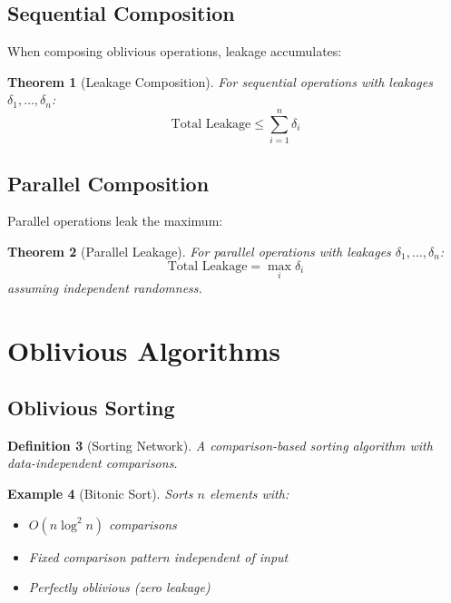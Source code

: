 \documentclass[11pt,final,hidelinks]{article}
\newtheorem{theorem}{Theorem}[section]
\newtheorem{definition}[theorem]{Definition}
\newtheorem{example}[theorem]{Example}
\begin{document}
\subsection{Sequential Composition}

When composing oblivious operations, leakage accumulates:

\begin{theorem}[Leakage Composition]
For sequential operations with leakages $\delta_1, \ldots, \delta_n$:
\begin{equation}
\text{Total Leakage} \leq \sum_{i=1}^n \delta_i
\end{equation}
\end{theorem}

\subsection{Parallel Composition}

Parallel operations leak the maximum:

\begin{theorem}[Parallel Leakage]
For parallel operations with leakages $\delta_1, \ldots, \delta_n$:
\begin{equation}
\text{Total Leakage} = \max_{i} \delta_i
\end{equation}
assuming independent randomness.
\end{theorem}

\section{Oblivious Algorithms}

\subsection{Oblivious Sorting}

\begin{definition}[Sorting Network]
A comparison-based sorting algorithm with data-independent comparisons.
\end{definition}

\begin{example}[Bitonic Sort]
Sorts $n$ elements with:
\begin{itemize}
    \item $O(n \log^2 n)$ comparisons
    \item Fixed comparison pattern independent of input
    \item Perfectly oblivious (zero leakage)
\end{itemize}
\end{example}
\end{document}

